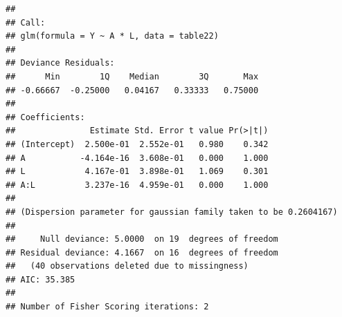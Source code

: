 \documentclass[
  10pt,
]{book}
\newenvironment{Shaded}{\begin{snugshade}}{\end{snugshade}}
\newcommand{\DataTypeTok}[1]{\textcolor[rgb]{0.13,0.29,0.53}{#1}}
\newcommand{\DecValTok}[1]{\textcolor[rgb]{0.00,0.00,0.81}{#1}}
\newcommand{\KeywordTok}[1]{\textcolor[rgb]{0.13,0.29,0.53}{\textbf{#1}}}
\newcommand{\NormalTok}[1]{#1}
\newcommand{\OperatorTok}[1]{\textcolor[rgb]{0.81,0.36,0.00}{\textbf{#1}}}
\newcommand{\OtherTok}[1]{\textcolor[rgb]{0.56,0.35,0.01}{#1}}
\newcommand{\StringTok}[1]{\textcolor[rgb]{0.31,0.60,0.02}{#1}}
\begin{document}
\begin{Shaded}
\end{Shaded}

\begin{verbatim}
## 
## Call:
## glm(formula = Y ~ A * L, data = table22)
## 
## Deviance Residuals: 
##      Min        1Q    Median        3Q       Max  
## -0.66667  -0.25000   0.04167   0.33333   0.75000  
## 
## Coefficients:
##               Estimate Std. Error t value Pr(>|t|)
## (Intercept)  2.500e-01  2.552e-01   0.980    0.342
## A           -4.164e-16  3.608e-01   0.000    1.000
## L            4.167e-01  3.898e-01   1.069    0.301
## A:L          3.237e-16  4.959e-01   0.000    1.000
## 
## (Dispersion parameter for gaussian family taken to be 0.2604167)
## 
##     Null deviance: 5.0000  on 19  degrees of freedom
## Residual deviance: 4.1667  on 16  degrees of freedom
##   (40 observations deleted due to missingness)
## AIC: 35.385
## 
## Number of Fisher Scoring iterations: 2
\end{verbatim}

\begin{Shaded}
\end{Shaded}
\end{document}
